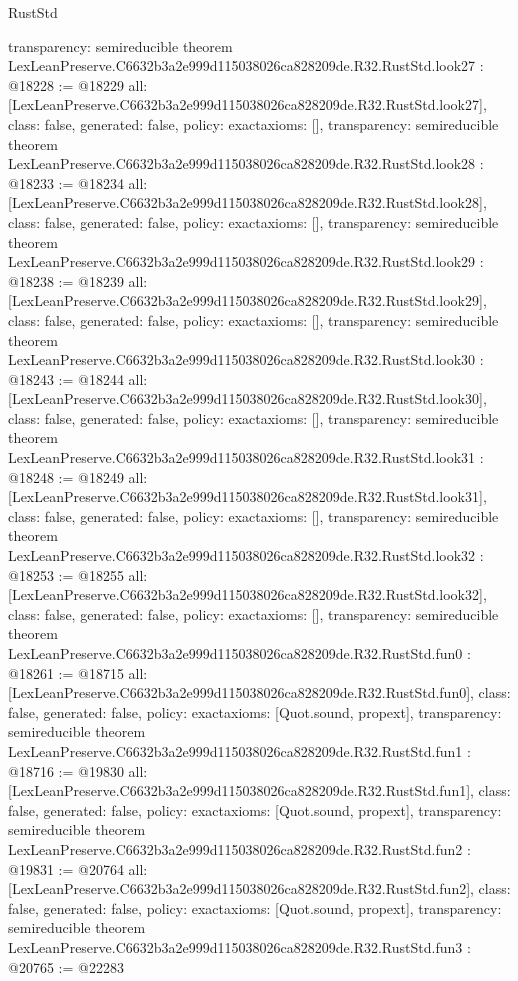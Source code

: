 \begin{lexlean}{RustStd}
\begin{coremodule}
{  transparency: semireducible
}
theorem LexLeanPreserve.C6632b3a2e999d115038026ca828209de.R32.RustStd.look27 : @18228 := @18229 {
  all: [LexLeanPreserve.C6632b3a2e999d115038026ca828209de.R32.RustStd.look27],
  class: false,
  generated: false,
  policy: exact{axioms: []},
  transparency: semireducible
}
theorem LexLeanPreserve.C6632b3a2e999d115038026ca828209de.R32.RustStd.look28 : @18233 := @18234 {
  all: [LexLeanPreserve.C6632b3a2e999d115038026ca828209de.R32.RustStd.look28],
  class: false,
  generated: false,
  policy: exact{axioms: []},
  transparency: semireducible
}
theorem LexLeanPreserve.C6632b3a2e999d115038026ca828209de.R32.RustStd.look29 : @18238 := @18239 {
  all: [LexLeanPreserve.C6632b3a2e999d115038026ca828209de.R32.RustStd.look29],
  class: false,
  generated: false,
  policy: exact{axioms: []},
  transparency: semireducible
}
theorem LexLeanPreserve.C6632b3a2e999d115038026ca828209de.R32.RustStd.look30 : @18243 := @18244 {
  all: [LexLeanPreserve.C6632b3a2e999d115038026ca828209de.R32.RustStd.look30],
  class: false,
  generated: false,
  policy: exact{axioms: []},
  transparency: semireducible
}
theorem LexLeanPreserve.C6632b3a2e999d115038026ca828209de.R32.RustStd.look31 : @18248 := @18249 {
  all: [LexLeanPreserve.C6632b3a2e999d115038026ca828209de.R32.RustStd.look31],
  class: false,
  generated: false,
  policy: exact{axioms: []},
  transparency: semireducible
}
theorem LexLeanPreserve.C6632b3a2e999d115038026ca828209de.R32.RustStd.look32 : @18253 := @18255 {
  all: [LexLeanPreserve.C6632b3a2e999d115038026ca828209de.R32.RustStd.look32],
  class: false,
  generated: false,
  policy: exact{axioms: []},
  transparency: semireducible
}
theorem LexLeanPreserve.C6632b3a2e999d115038026ca828209de.R32.RustStd.fun0 : @18261 := @18715 {
  all: [LexLeanPreserve.C6632b3a2e999d115038026ca828209de.R32.RustStd.fun0],
  class: false,
  generated: false,
  policy: exact{axioms: [Quot.sound, propext]},
  transparency: semireducible
}
theorem LexLeanPreserve.C6632b3a2e999d115038026ca828209de.R32.RustStd.fun1 : @18716 := @19830 {
  all: [LexLeanPreserve.C6632b3a2e999d115038026ca828209de.R32.RustStd.fun1],
  class: false,
  generated: false,
  policy: exact{axioms: [Quot.sound, propext]},
  transparency: semireducible
}
theorem LexLeanPreserve.C6632b3a2e999d115038026ca828209de.R32.RustStd.fun2 : @19831 := @20764 {
  all: [LexLeanPreserve.C6632b3a2e999d115038026ca828209de.R32.RustStd.fun2],
  class: false,
  generated: false,
  policy: exact{axioms: [Quot.sound, propext]},
  transparency: semireducible
}
theorem LexLeanPreserve.C6632b3a2e999d115038026ca828209de.R32.RustStd.fun3 : @20765 := @22283 {
}
\end{coremodule}
\end{lexlean}

